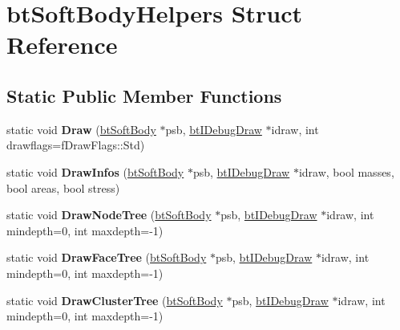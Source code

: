\hypertarget{structbtSoftBodyHelpers}{}\section{bt\+Soft\+Body\+Helpers Struct Reference}
\label{structbtSoftBodyHelpers}
\subsection*{Static Public Member Functions}
\begin{DoxyCompactItemize}
\item 
\mbox{\label{structbtSoftBodyHelpers_aa13548829cdaa2f8d3cdd682ab658bf7}} 
static void {\bfseries Draw} (\hyperlink{classbtSoftBody}{bt\+Soft\+Body} $\ast$psb, \hyperlink{classbtIDebugDraw}{bt\+I\+Debug\+Draw} $\ast$idraw, int drawflags=f\+Draw\+Flags\+::\+Std)
\item 
\mbox{\label{structbtSoftBodyHelpers_a6f12ed786886ba13224bd36b9f2e2346}} 
static void {\bfseries Draw\+Infos} (\hyperlink{classbtSoftBody}{bt\+Soft\+Body} $\ast$psb, \hyperlink{classbtIDebugDraw}{bt\+I\+Debug\+Draw} $\ast$idraw, bool masses, bool areas, bool stress)
\item 
\mbox{\label{structbtSoftBodyHelpers_a2e6b38d4cffb1a98d81a3af55704686e}} 
static void {\bfseries Draw\+Node\+Tree} (\hyperlink{classbtSoftBody}{bt\+Soft\+Body} $\ast$psb, \hyperlink{classbtIDebugDraw}{bt\+I\+Debug\+Draw} $\ast$idraw, int mindepth=0, int maxdepth=-\/1)
\item 
\mbox{\label{structbtSoftBodyHelpers_a56a1fa5900877d6b0c06de4787a995fe}} 
static void {\bfseries Draw\+Face\+Tree} (\hyperlink{classbtSoftBody}{bt\+Soft\+Body} $\ast$psb, \hyperlink{classbtIDebugDraw}{bt\+I\+Debug\+Draw} $\ast$idraw, int mindepth=0, int maxdepth=-\/1)
\item 
\mbox{\label{structbtSoftBodyHelpers_a7d0e5fd9ecf565e6605af383092a733f}} 
static void {\bfseries Draw\+Cluster\+Tree} (\hyperlink{classbtSoftBody}{bt\+Soft\+Body} $\ast$psb, \hyperlink{classbtIDebugDraw}{bt\+I\+Debug\+Draw} $\ast$idraw, int mindepth=0, int maxdepth=-\/1)
\item 
\mbox{\label{structbtSoftBodyHelpers_acbdfb1037e14e5e77acd96ce84452447}} 

\end{DoxyCompactItemize}
